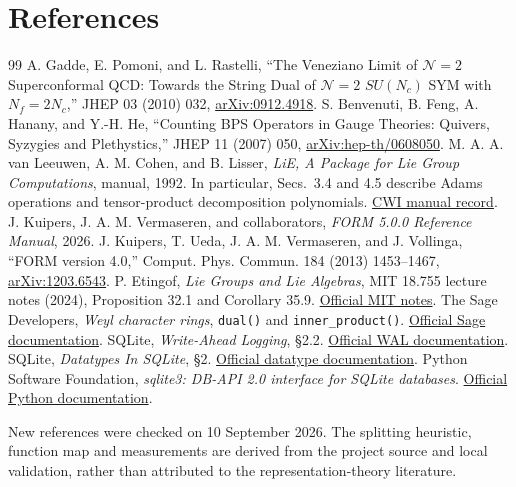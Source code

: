 \documentclass[11pt,a4paper]{article}
\newcommand{\code}[1]{{\small\nolinkurl{#1}}}
\begin{document}
\section*{References}\label{sec:refs}
\begingroup\renewcommand{\section}[2]{}\begin{thebibliography}{99}
 A. Gadde, E. Pomoni, and L. Rastelli, ``The Veneziano Limit of
$\mathcal N=2$ Superconformal QCD: Towards the String Dual of $\mathcal N=2$
$SU(N_c)$ SYM with $N_f=2N_c$,'' JHEP 03 (2010) 032,
\href{https://arxiv.org/abs/0912.4918}{arXiv:0912.4918}.
 S. Benvenuti, B. Feng, A. Hanany, and Y.-H. He,
``Counting BPS Operators in Gauge Theories: Quivers, Syzygies and Plethystics,''
JHEP 11 (2007) 050, \href{https://arxiv.org/abs/hep-th/0608050}{arXiv:hep-th/0608050}.
 M. A. A. van Leeuwen, A. M. Cohen, and B. Lisser,
\emph{LiE, A Package for Lie Group Computations}, manual, 1992. In particular,
Secs.~3.4 and 4.5 describe Adams operations and tensor-product decomposition
polynomials. \href{https://ir.cwi.nl/pub/29817}{CWI manual record}.
 J. Kuipers, J. A. M. Vermaseren, and collaborators,
\emph{FORM 5.0.0 Reference Manual}, 2026.
 J. Kuipers, T. Ueda, J. A. M. Vermaseren, and J. Vollinga,
``FORM version 4.0,'' Comput. Phys. Commun. 184 (2013) 1453--1467,
\href{https://arxiv.org/abs/1203.6543}{arXiv:1203.6543}.
 P. Etingof, \emph{Lie Groups and Lie Algebras}, MIT 18.755
lecture notes (2024), Proposition 32.1 and Corollary 35.9.
\href{https://ocw.mit.edu/courses/18-755-lie-groups-and-lie-algebras-ii-spring-2024/mit18_755_s24_lec_full.pdf}{Official MIT notes}.
 The Sage Developers, \emph{Weyl character rings},
\code{dual()} and \code{inner_product()}.
\href{https://doc.sagemath.org/html/en/reference/combinat/sage/combinat/root_system/weyl_characters.html}{Official Sage documentation}.
 SQLite, \emph{Write-Ahead Logging}, \S2.2.
\href{https://www.sqlite.org/wal.html}{Official WAL documentation}.
 SQLite, \emph{Datatypes In SQLite}, \S2.
\href{https://www.sqlite.org/datatype3.html}{Official datatype documentation}.
 Python Software Foundation, \emph{sqlite3: DB-API 2.0
interface for SQLite databases}.
\href{https://docs.python.org/3/library/sqlite3.html}{Official Python documentation}.
\end{thebibliography}\endgroup
New references were checked on 10 September 2026. The splitting heuristic,
function map and measurements are derived from the project source and local
validation, rather than attributed to the representation-theory literature.
\end{document}
